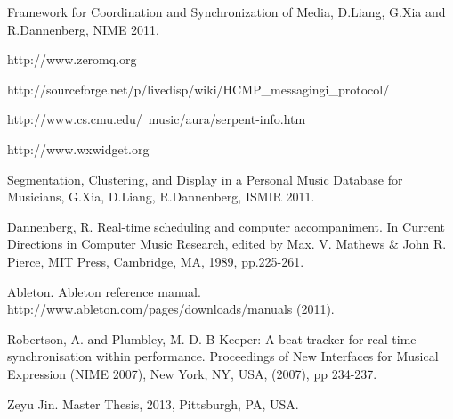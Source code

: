 \documentclass[12pt]{Latex/Classes/PhDthesisPSnPDF}
\begin{document}
\setcounter{page}{2}

\frontmatter



\setcounter{secnumdepth}{3} %
\setcounter{tocdepth}{3}    %
\tableofcontents %

\listoffigures	%

\listoftables

\newpage %


\pagestyle{headings}
\setcounter{page}{1}

\mainmatter
\renewcommand{\chaptername}{} %



			
	
%





\begin{thebibliography}{pubext}
%

Framework for Coordination and Synchronization of Media, D.Liang, G.Xia and R.Dannenberg, NIME 2011.

http://www.zeromq.org

http://sourceforge.net/p/livedisp/wiki/HCMP\_messagingi\_protocol/

http://www.cs.cmu.edu/~music/aura/serpent-info.htm

http://www.wxwidget.org

Segmentation, Clustering, and Display in a Personal Music Database for Musicians,
G.Xia, D.Liang, R.Dannenberg, ISMIR 2011.

Dannenberg, R. Real-time scheduling and computer accompaniment. In Current
Directions in Computer Music Research, edited by Max. V. Mathews \& John R.
Pierce, MIT Press, Cambridge, MA, 1989, pp.225-261.

Ableton. Ableton reference manual.
http://www.ableton.com/pages/downloads/manuals (2011).

Robertson, A. and Plumbley, M. D. B-Keeper: A beat tracker for real time
synchronisation within performance. Proceedings of New Interfaces for Musical
Expression (NIME 2007), New York, NY, USA, (2007), pp 234-237.

Zeyu Jin. Master Thesis, 2013, Pittsburgh, PA, USA.

\end{thebibliography}


\end{document}
